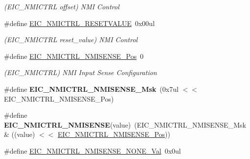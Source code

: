 \begin{DoxyCompactItemize}
\begin{DoxyCompactList}\small\item\em (E\+I\+C\+\_\+\+N\+M\+I\+C\+T\+R\+L offset) N\+M\+I Control \end{DoxyCompactList}\item 
\hypertarget{group___s_a_m_l21___e_i_c_ga45890ac5e43ba08bf235b5ba44aa434c}{}\#define \hyperlink{group___s_a_m_l21___e_i_c_ga45890ac5e43ba08bf235b5ba44aa434c}{E\+I\+C\+\_\+\+N\+M\+I\+C\+T\+R\+L\+\_\+\+R\+E\+S\+E\+T\+V\+A\+L\+U\+E}~0x00ul\label{group___s_a_m_l21___e_i_c_ga45890ac5e43ba08bf235b5ba44aa434c}

\begin{DoxyCompactList}\small\item\em (E\+I\+C\+\_\+\+N\+M\+I\+C\+T\+R\+L reset\+\_\+value) N\+M\+I Control \end{DoxyCompactList}\item 
\hypertarget{group___s_a_m_l21___e_i_c_ga48859c121f51b57ddf343ba53ff169a1}{}\#define \hyperlink{group___s_a_m_l21___e_i_c_ga48859c121f51b57ddf343ba53ff169a1}{E\+I\+C\+\_\+\+N\+M\+I\+C\+T\+R\+L\+\_\+\+N\+M\+I\+S\+E\+N\+S\+E\+\_\+\+Pos}~0\label{group___s_a_m_l21___e_i_c_ga48859c121f51b57ddf343ba53ff169a1}

\begin{DoxyCompactList}\small\item\em (E\+I\+C\+\_\+\+N\+M\+I\+C\+T\+R\+L) N\+M\+I Input Sense Configuration \end{DoxyCompactList}\item 
\hypertarget{group___s_a_m_l21___e_i_c_gab9c1c6466c0a1f2d669d61904b4ad1c0}{}\#define {\bfseries E\+I\+C\+\_\+\+N\+M\+I\+C\+T\+R\+L\+\_\+\+N\+M\+I\+S\+E\+N\+S\+E\+\_\+\+Msk}~(0x7ul $<$$<$ E\+I\+C\+\_\+\+N\+M\+I\+C\+T\+R\+L\+\_\+\+N\+M\+I\+S\+E\+N\+S\+E\+\_\+\+Pos)\label{group___s_a_m_l21___e_i_c_gab9c1c6466c0a1f2d669d61904b4ad1c0}

\item 
\hypertarget{group___s_a_m_l21___e_i_c_gae96214c1f37b2db4a8fa349edb32996f}{}\#define {\bfseries E\+I\+C\+\_\+\+N\+M\+I\+C\+T\+R\+L\+\_\+\+N\+M\+I\+S\+E\+N\+S\+E}(value)~(E\+I\+C\+\_\+\+N\+M\+I\+C\+T\+R\+L\+\_\+\+N\+M\+I\+S\+E\+N\+S\+E\+\_\+\+Msk \& ((value) $<$$<$ \hyperlink{group___s_a_m_l21___e_i_c_ga48859c121f51b57ddf343ba53ff169a1}{E\+I\+C\+\_\+\+N\+M\+I\+C\+T\+R\+L\+\_\+\+N\+M\+I\+S\+E\+N\+S\+E\+\_\+\+Pos}))\label{group___s_a_m_l21___e_i_c_gae96214c1f37b2db4a8fa349edb32996f}

\item 
\hypertarget{group___s_a_m_l21___e_i_c_ga0c36b33d81bd5571bc49345e2e83b9ff}{}\#define \hyperlink{group___s_a_m_l21___e_i_c_ga0c36b33d81bd5571bc49345e2e83b9ff}{E\+I\+C\+\_\+\+N\+M\+I\+C\+T\+R\+L\+\_\+\+N\+M\+I\+S\+E\+N\+S\+E\+\_\+\+N\+O\+N\+E\+\_\+\+Val}~0x0ul\label{group___s_a_m_l21___e_i_c_ga0c36b33d81bd5571bc49345e2e83b9ff}


\end{DoxyCompactItemize}
